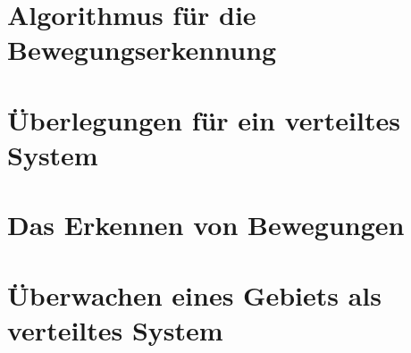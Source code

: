\documentclass[9pt,a4paper]{IEEEtran}
\begin{document}
\section{Algorithmus für die Bewegungserkennung}


\section{Überlegungen für ein verteiltes System}



\section{Das Erkennen von Bewegungen}


\section{Überwachen eines Gebiets als verteiltes System}


\printbibliography
\end{document}
